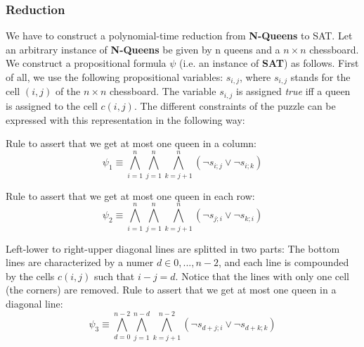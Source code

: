 


\subsubsection{Reduction}

We have to construct a polynomial-time reduction from \textbf{N-Queens} to
SAT. Let an arbitrary instance of \textbf{N-Queens} be given by n queens and
a $n\times n$ chessboard. We construct a propositional formula $\psi $ (i.e.
an instance of \textbf{SAT}) as follows.\newline
First of all, we use the following propositional variables: $s_{i,j}$, where 
$s_{i,j}$ stands for the cell $(i,j)$ of the $n\times n$ chessboard. The
variable $s_{i,j}$ is assigned \textit{true} iff a queen is assigned to the
cell $c(i,j)$. The different constraints of the puzzle can be expressed with
this representation in the following way:

\noindent Rule to assert that we get at most one queen in a column: 
\begin{equation*}
\psi_1 \equiv
\bigwedge_{i=1}^{n}\bigwedge_{j=1}^{n}\bigwedge_{k=j+1}^{n}(\neg s_{i;j}
\vee \neg s_{i;k})
\end{equation*}

\noindent Rule to assert that we get at most one queen in each row: 
\begin{equation*}
\psi_2 \equiv
\bigwedge_{i=1}^{n}\bigwedge_{j=1}^{n}\bigwedge_{k=j+1}^{n}(\neg s_{j;i}
\vee \neg s_{k;i})
\end{equation*}

\noindent Left-lower to right-upper diagonal lines are splitted in two
parts: The bottom lines are characterized by a numer $d\in {0,...,n-2}$, and
each line is compounded by the cells $c(i,j)$ such that $i-j=d$. Notice that
the lines with only one cell (the corners) are removed.\newline
Rule to assert that we get at most one queen in a diagonal line: 
\begin{equation*}
\psi _{3}\equiv
\bigwedge_{d=0}^{n-2}\bigwedge_{j=1}^{n-d}\bigwedge_{k=j+1}^{n-2}(\lnot
s_{d+j;i}\vee \lnot s_{d+k;k})
\end{equation*}

